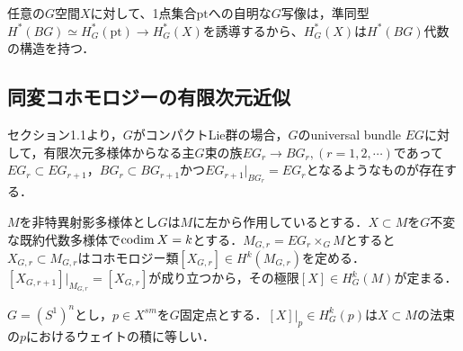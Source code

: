 任意の$G$空間$X$に対して、1点集合$\text{pt}$への自明な$G$写像は，準同型$H^*(BG)\simeq H^*_G(\text{pt})\rightarrow H^*_G(X)$を誘導するから、$H^*_G(X)$は$H^*(BG)$代数の構造を持つ．



\subsection{同変コホモロジーの有限次元近似}

セクション1.1より，$G$がコンパクトLie群の場合，$G$のuniversal bundle $EG$に対して，有限次元多様体からなる主$G$束の族$EG_r\rightarrow BG_r, (r=1,2,\cdots)$であって$EG_r\subset EG_{r+1}$，$BG_r\subset BG_{r+1}$かつ$EG_{r+1}|_{BG_r} = EG_r$となるようなものが存在する．


$M$を非特異射影多様体とし$G$は$M$に左から作用しているとする．$X\subset M$を$G$不変な既約代数多様体で$\text{codim}\: X =k$とする．$M_{G,r}=EG_r\times_GM$とすると$X_{G,r}\subset M_{G,r}$はコホモロジー類$[X_{G,r}]\in H^k(M_{G,r})$を定める\cite{fulton young tableaux}．$[X_{G,r+1}]|_{M_{G,r}} = [X_{G,r}]$が成り立つから，その極限$[X]\in H^k_G(M)$が定まる．


\begin{prop}\label{restriction to fixed point}
  $G=(S^1)^n$とし，$p\in X^{sm}$を$G$固定点とする．$[X]|_p\in H^k_G(p)$は$X\subset M$の法束の$p$におけるウェイトの積に等しい．
\end{prop}

